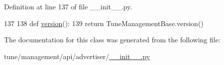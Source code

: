 Definition at line 137 of file \-\_\-\-\_\-init\-\_\-\-\_\-.\-py.


\begin{DoxyCode}
137 
138     \textcolor{keyword}{def }\hyperlink{classtune_1_1management_1_1api_1_1advertiser_1_1Advertiser_a930b9245bf74b54deff8d6cd64aa37f4}{version}():
139         \textcolor{keywordflow}{return} TuneManagementBase.version()
\end{DoxyCode}


The documentation for this class was generated from the following file\-:\begin{DoxyCompactItemize}
\item 
tune/management/api/advertiser/\hyperlink{management_2api_2advertiser_2____init_____8py}{\-\_\-\-\_\-init\-\_\-\-\_\-.\-py}\end{DoxyCompactItemize}
